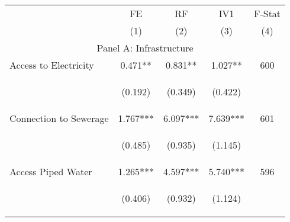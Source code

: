 \begin{tabular}{lcccc}


\toprule


\multicolumn{1}{l}{} & \multicolumn{1}{c}{FE} & \multicolumn{1}{c}{RF} & \multicolumn{1}{c}{IV1} & F-Stat  \\

 & (1) & (2) & (3) & (4)  \\ 
 

\hline

\multicolumn{5}{c}{Panel A: Infrastructure}   \\                                                          

Access to Electricity   &  0.471**    &    0.831**   &     1.027**  &  600 \\

\vspace{4pt} &  \begin{footnotesize}(0.192)\end{footnotesize}   &
			    \begin{footnotesize}(0.349)\end{footnotesize}   &
			    \begin{footnotesize}(0.422)\end{footnotesize}   &
			     \\          


Connection to Sewerage   &  1.767***    &    6.097***   &     7.639***  &  601  \\

\vspace{4pt} &  \begin{footnotesize}(0.485)\end{footnotesize}   &
			    \begin{footnotesize}(0.935)\end{footnotesize}   &
			    \begin{footnotesize}(1.145)\end{footnotesize}   &
			     \\          


Access Piped Water  &  1.265***    &    4.597***   &     5.740***  &  596  \\

\vspace{4pt} &  \begin{footnotesize}(0.406)\end{footnotesize}   &
			    \begin{footnotesize}(0.932)\end{footnotesize}   &
			    \begin{footnotesize}(1.124)\end{footnotesize}   &
			     \\          




\end{tabular}
